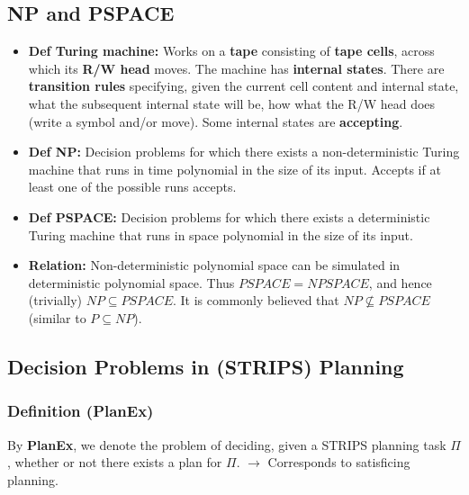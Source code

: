 \documentclass[conference, a4paper]{styles/acmsiggraph}
\begin{document}
    \subsection{NP and PSPACE}
        \begin{itemize}
            \item \textbf{Def Turing machine:}\newline 
            Works on a \textbf{tape} consisting of \textbf{tape cells}, across which its \textbf{R/W head} moves. 
            The machine has \textbf{internal states}. 
            There are \textbf{transition rules} specifying, given the current cell content and internal state, what the subsequent internal state will be, how what the R/W head does (write a symbol and/or move). 
            Some internal states are \textbf{accepting}.
            \item \textbf{Def NP:}\newline 
            Decision problems for which there exists a non-deterministic Turing machine that runs in time polynomial in the size of its input. 
            Accepts if at least one of the possible runs accepts.
            \item \textbf{Def PSPACE:}\newline 
            Decision problems for which there exists a deterministic Turing machine that runs in space polynomial in the size of its input.
            \item \textbf{Relation:}\newline 
            Non-deterministic polynomial space can be simulated in deterministic polynomial space.\newline
            Thus $PSPACE = NPSPACE$, and hence (trivially) $NP \subseteq PSPACE$. 
            It is commonly believed that $NP \nsubseteq PSPACE$ (similar to $P \subseteq NP$).
        \end{itemize}
    
    \subsection{Decision Problems in (STRIPS) Planning}
        \subsubsection{Definition (PlanEx)}
            By \textbf{PlanEx}, we denote the problem of deciding, given a STRIPS planning task $\Pi$, whether or not there exists a plan for $\Pi$.\newline 
            $\rightarrow$ Corresponds to satisficing planning.
        
\end{document}
